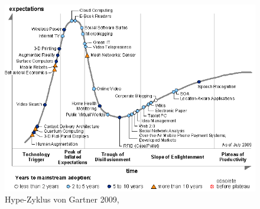 \medskip
\begin{figure}[H] 
  \begin{center}
    \includegraphics[width=\textwidth]{grafik/gartner-hype-cycle-2009} 
  \end{center}
  \caption{Hype-Zyklus von Gartner 2009, \cite{cloud:hypecycle}}
\end{figure}


